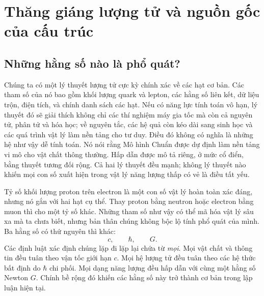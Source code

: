 \chapter{Thăng giáng lượng tử và nguồn gốc của cấu trúc}


\section{Những hằng số nào là phổ quát?}

Chúng ta có một lý thuyết lượng tử cực kỳ chính xác về các hạt cơ bản. Các tham số của nó bao gồm khối lượng quark và lepton, các hằng số liên kết, dữ liệu trộn, điện tích, và chính danh sách các hạt. Nếu có năng lực tính toán vô hạn, lý thuyết đó sẽ giải thích không chỉ các thí nghiệm máy gia tốc mà còn cả nguyên tử, phân tử và hóa học; về nguyên tắc, các hệ quả còn kéo dài sang sinh học và các quá trình vật lý làm nền tảng cho tư duy. Điều đó không có nghĩa là những hệ như vậy dễ tính toán. Nó nói rằng Mô hình Chuẩn được dự định làm nền tảng vi mô cho vật chất thông thường. Hấp dẫn được mô tả riêng, ở mức cổ điển, bằng thuyết tương đối rộng. Cả hai lý thuyết đều mạnh; không lý thuyết nào khiến mọi con số xuất hiện trong vật lý năng lượng thấp có vẻ là điều tất yếu.

Tỷ số khối lượng proton trên electron là một con số vật lý hoàn toàn xác đáng, nhưng nó gắn với hai hạt cụ thể. Thay proton bằng neutron hoặc electron bằng muon thì cho một tỷ số khác. Những tham số như vậy có thể mã hóa vật lý sâu xa mà ta chưa biết, nhưng bản thân chúng không bộc lộ tính phổ quát của mình. Ba hằng số có thứ nguyên thì khác:
\[
c,\qquad \hbar,\qquad G.
\]
Các định luật xác định chúng lặp đi lặp lại chứa từ \emph{mọi}. Mọi vật chất và thông tin đều tuân theo vận tốc giới hạn \(c\). Mọi hệ lượng tử đều tuân theo các hệ thức bất định do \(\hbar\) chi phối. Mọi dạng năng lượng đều hấp dẫn với cùng một hằng số Newton \(G\). Chính bề rộng đó khiến các hằng số này trở thành cơ bản trong lập luận hiện tại.


